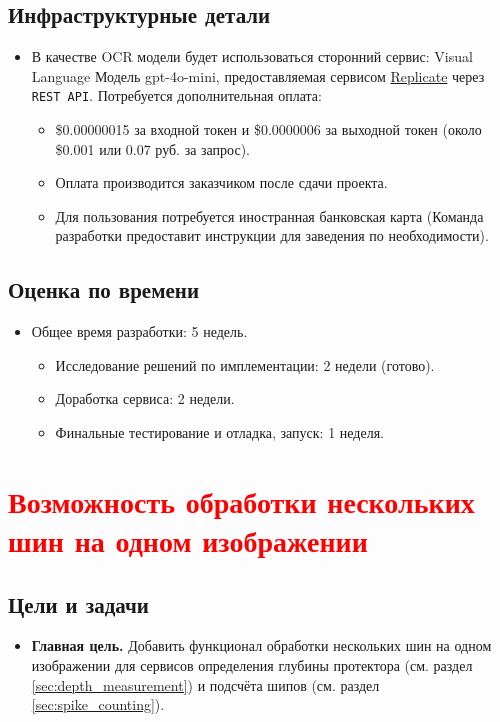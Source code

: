 \documentclass[12pt]{article}
\begin{document}
\subsection{Инфраструктурные детали}
\begin{itemize}
	\item В качестве OCR модели будет использоваться сторонний сервис: Visual Language Модель gpt-4o-mini, предоставляемая сервисом \href{https://replicate.com/}{Replicate} через \texttt{REST API}. Потребуется дополнительная оплата:
	      \begin{itemize}
		      \item \$0.00000015 за входной токен и \$0.0000006 за выходной токен (около \$0.001 или 0.07 руб. за запрос).
		      \item Оплата производится заказчиком после сдачи проекта.
		      \item Для пользования потребуется иностранная банковская карта (Команда разработки предоставит инструкции для заведения по необходимости).
	      \end{itemize}
\end{itemize}


\subsection{Оценка по времени}
\begin{itemize}
	\item Общее время разработки: 5 недель.
	      \begin{itemize}
		      \item Исследование решений по имплементации: 2 недели (готово).
		      \item Доработка сервиса: 2 недели.
		      \item Финальные тестирование и отладка, запуск: 1 неделя.
	      \end{itemize}
\end{itemize}


\section{\textcolor{red}{Возможность обработки нескольких шин на одном изображении}}
\subsection{Цели и задачи}
\begin{itemize}
	\item \textbf{Главная цель.} Добавить функционал обработки нескольких шин на одном изображении для сервисов определения глубины протектора (см. раздел \ref{sec:depth_measurement}) и подсчёта шипов (см. раздел \ref{sec:spike_counting}).
\end{itemize}
\end{document}
